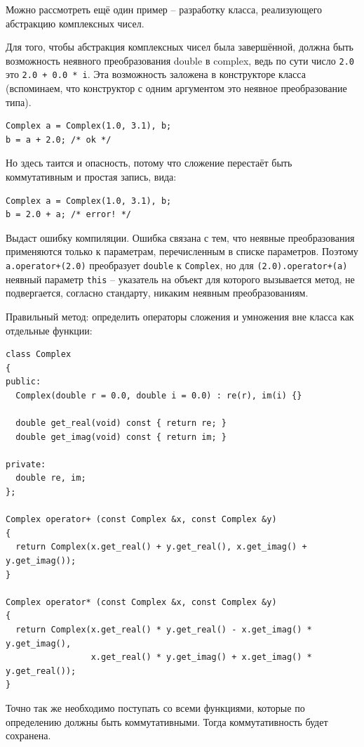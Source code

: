 \documentclass[a4paper,12pt,oneside]{article}
\begin{document}
Можно рассмотреть ещё один пример -- разработку класса, реализующего абстракцию комплексных чисел.

Для того, чтобы абстракция комплексных чисел была завершённой, должна быть возможность неявного преобразования double в complex, ведь по сути число \lstinline!2.0! это \lstinline!2.0 + 0.0 * i!. Эта возможность заложена в конструкторе класса (вспоминаем, что конструктор с одним аргументом это неявное преобразование типа).

\begin{lstlisting}
Complex a = Complex(1.0, 3.1), b;
b = a + 2.0; /* ok */
\end{lstlisting}

Но здесь таится и опасность, потому что сложение перестаёт быть коммутативным и простая запись, вида:

\begin{lstlisting}
Complex a = Complex(1.0, 3.1), b;
b = 2.0 + a; /* error! */
\end{lstlisting}

Выдаст ошибку компиляции. Ошибка связана с тем, что неявные преобразования применяются только к параметрам, перечисленным в списке параметров. Поэтому \lstinline!a.operator+(2.0)! преобразует \lstinline!double! к \lstinline!Complex!, но для \lstinline!(2.0).operator+(a)! неявный параметр \lstinline!this! -- указатель на объект для которого вызывается метод, не подвергается, согласно стандарту, никаким неявным преобразованиям.

Правильный метод: определить операторы сложения и умножения вне класса как отдельные функции:

\begin{lstlisting}
class Complex
{
public:
  Complex(double r = 0.0, double i = 0.0) : re(r), im(i) {}

  double get_real(void) const { return re; }
  double get_imag(void) const { return im; }

private:
  double re, im;  
};

Complex operator+ (const Complex &x, const Complex &y) 
{ 
  return Complex(x.get_real() + y.get_real(), x.get_imag() + y.get_imag()); 
}

Complex operator* (const Complex &x, const Complex &y) 
{ 
  return Complex(x.get_real() * y.get_real() - x.get_imag() * y.get_imag(), 
                 x.get_real() * y.get_imag() + x.get_imag() * y.get_real()); 
}
\end{lstlisting}

Точно так же необходимо поступать со всеми функциями, которые по определению должны быть коммутативными. Тогда коммутативность будет сохранена.
\end{document}

